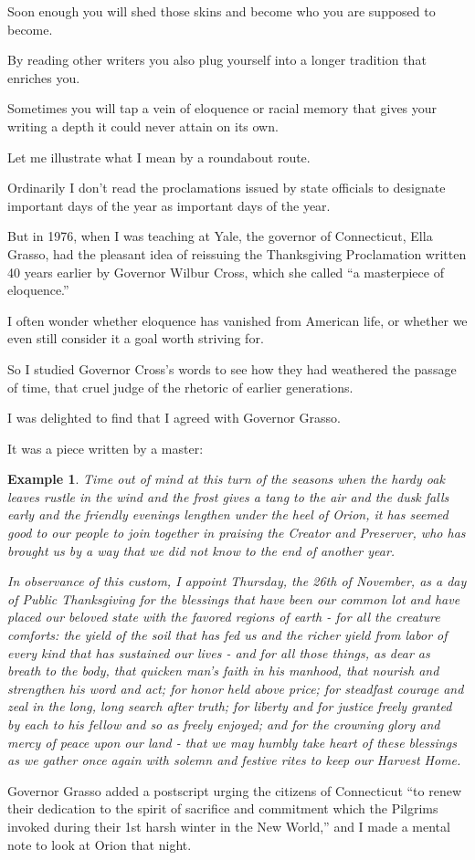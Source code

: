 \documentclass{book}
\numberwithin{equation}{section}
\newtheorem{example}{Example}[chapter]
\begin{document}
Soon enough you will shed those skins and become who you are supposed to become.

By reading other writers you also plug yourself into a longer tradition that enriches you.

Sometimes you will tap a vein of eloquence or racial memory that gives your writing a depth it could never attain on its own.

Let me illustrate what I mean by a roundabout route.

%
Ordinarily I don't read the proclamations issued by state officials to designate important days of the year as important days of the year.

But in 1976, when I was teaching at Yale, the governor of Connecticut, Ella Grasso, had the pleasant idea of reissuing the Thanksgiving Proclamation written 40 years earlier by Governor Wilbur Cross, which she called ``a masterpiece of eloquence.''

I often wonder whether eloquence has vanished from American life, or whether we even still consider it a goal worth striving for.

So I studied Governor Cross's words to see how they had weathered the passage of time, that cruel judge of the rhetoric of earlier generations.

I was delighted to find that I agreed with Governor Grasso.

It was a piece written by a master:
\begin{example}
    Time out of mind at this turn of the seasons when the hardy oak leaves rustle in the wind and the frost gives a tang to the air and the dusk falls early and the friendly evenings lengthen under the heel of Orion, it has seemed good to our people to join together in praising the Creator and Preserver, who has brought us by a way that we did not know to the end of another year.
    
    In observance of this custom, I appoint Thursday, the 26th of November, as a day of Public Thanksgiving for the blessings that have been our common lot and have placed our beloved state with the favored regions of earth - for all the creature comforts: the yield of the soil that has fed us and the richer yield from labor of every kind that has sustained our lives - and for all those things, as dear as breath to the body, that quicken man's faith in his manhood, that nourish and strengthen his word and act; for honor held above price; for steadfast courage and zeal in the long, long search after truth; for liberty and for justice freely granted by each to his fellow and so as freely enjoyed; and for the crowning glory and mercy of peace upon our land - that we may humbly take heart of these blessings as we gather once again with solemn and festive rites to keep our Harvest Home.
\end{example}
Governor Grasso added a postscript urging the citizens of Connecticut ``to renew their dedication to the spirit of sacrifice and commitment which the Pilgrims invoked during their 1st harsh winter in the New World,'' and I made a mental note to look at Orion that night.
\end{document}
